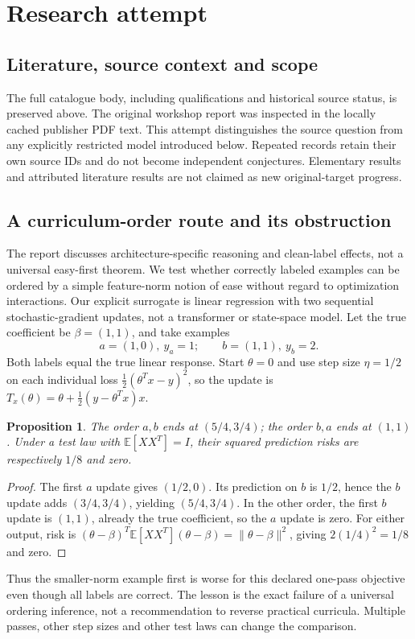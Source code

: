 \documentclass[11pt]{article}
\newtheorem{proposition}{Proposition}
\begin{document}
\section{Research attempt}
\subsection{Literature, source context and scope}
The full catalogue body, including qualifications and historical source status, is preserved above. The original workshop report was inspected in the locally cached publisher PDF text. This attempt distinguishes the source question from any explicitly restricted model introduced below. Repeated records retain their own source IDs and do not become independent conjectures. Elementary results and attributed literature results are not claimed as new original-target progress.

\subsection{A curriculum-order route and its obstruction}
The report discusses architecture-specific reasoning and clean-label effects, not a universal easy-first theorem. We test whether correctly labeled examples can be ordered by a simple feature-norm notion of ease without regard to optimization interactions. Our explicit surrogate is linear regression with two sequential stochastic-gradient updates, not a transformer or state-space model.
Let the true coefficient be $\beta=(1,1)$, and take examples
\[
 a=(1,0),\ y_a=1;\qquad b=(1,1),\ y_b=2.
\]
Both labels equal the true linear response. Start $\theta=0$ and use step size $\eta=1/2$ on each individual loss $\tfrac12(\theta^Tx-y)^2$, so the update is
$T_x(\theta)=\theta+\tfrac12(y-\theta^Tx)x$.
\begin{proposition}
The order $a,b$ ends at $(5/4,3/4)$; the order $b,a$ ends at $(1,1)$. Under a test law with $\mathbb E[XX^T]=I$, their squared prediction risks are respectively $1/8$ and zero.
\end{proposition}
\begin{proof}
The first $a$ update gives $(1/2,0)$. Its prediction on $b$ is $1/2$, hence the $b$ update adds $(3/4,3/4)$, yielding $(5/4,3/4)$. In the other order, the first $b$ update is $(1,1)$, already the true coefficient, so the $a$ update is zero. For either output, risk is $(\theta-\beta)^T\mathbb E[XX^T](\theta-\beta)=\|\theta-\beta\|^2$, giving $2(1/4)^2=1/8$ and zero.
\end{proof}
Thus the smaller-norm example first is worse for this declared one-pass objective even though all labels are correct. The lesson is the exact failure of a universal ordering inference, not a recommendation to reverse practical curricula. Multiple passes, other step sizes and other test laws can change the comparison.
\end{document}

